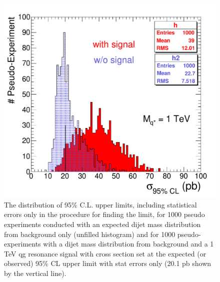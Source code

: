 \begin{figure}[!hb]
  \begin{center}
    \includegraphics[width=\textwidth]{Figures/FrequentistStatonlyMass1TeV.pdf}
    \caption{The distribution of 95\% C.L. upper limits, including 
    statistical errors only in the procedure for finding the limit, 
    for 1000 pseudo experiments conducted with an expected dijet mass distribution 
    from background only (unfilled histogram) and for 1000 pseudo-experiments
    with a dijet mass distribution from background and a 1 TeV qg resonance signal
    with cross section set at the expected (or observed) 95\% CL upper limit with stat errors
    only (20.1 pb shown by the vertical line).}
    \label{FrequentistStatOnly}
  \end{center}
\end{figure}


